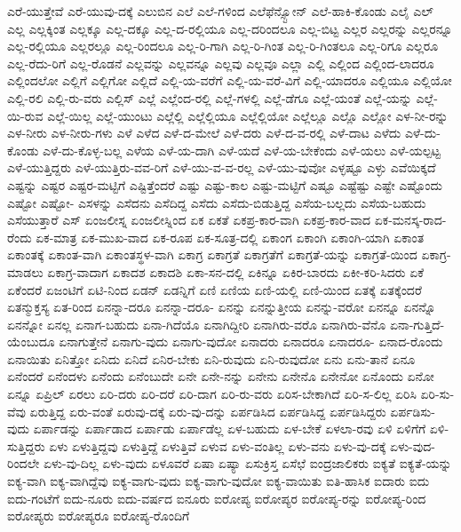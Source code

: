 {ಎರೆ-ಯುತ್ತೇವೆ
ಎರೆ-ಯುವು-ದಕ್ಕೆ
ಎಲುಬಿನ
ಎಲೆ
ಎಲೆ-ಗಳಿಂದ
ಎಲೆಫೆನ್ಸ್ಟೋನ್
ಎಲೆ-ಹಾಕಿ-ಕೊಂಡು
ಎಲೈ
ಎಲ್
ಎಲ್ಲ
ಎಲ್ಲಕ್ಕಿಂತ
ಎಲ್ಲಕ್ಕೂ
ಎಲ್ಲ-ದಕ್ಕೂ
ಎಲ್ಲ-ದ-ರಲ್ಲಿಯೂ
ಎಲ್ಲ-ದರಿಂದಲೂ
ಎಲ್ಲ-ಬಿಟ್ಟ
ಎಲ್ಲರ
ಎಲ್ಲರನ್ನು
ಎಲ್ಲರನ್ನೂ
ಎಲ್ಲ-ರಲ್ಲಿಯೂ
ಎಲ್ಲರಲ್ಲೂ
ಎಲ್ಲ-ರಿಂದಲೂ
ಎಲ್ಲ-ರಿ-ಗಾಗಿ
ಎಲ್ಲ-ರಿ-ಗಿಂತ
ಎಲ್ಲ-ರಿ-ಗಿಂತಲೂ
ಎಲ್ಲ-ರಿಗೂ
ಎಲ್ಲರೂ
ಎಲ್ಲ-ರೆದು-ರಿಗೆ
ಎಲ್ಲ-ರೊಡನೆ
ಎಲ್ಲವನ್ನು
ಎಲ್ಲವನ್ನೂ
ಎಲ್ಲವು
ಎಲ್ಲವೂ
ಎಲ್ಲಾ
ಎಲ್ಲಿ
ಎಲ್ಲಿಂದ
ಎಲ್ಲಿಂದ-ಲಾದರೂ
ಎಲ್ಲಿಂದಲೋ
ಎಲ್ಲಿಗೆ
ಎಲ್ಲಿಗೋ
ಎಲ್ಲಿದೆ
ಎಲ್ಲಿ-ಯ-ವರೆಗೆ
ಎಲ್ಲಿ-ಯ-ವರೆ-ವಿಗೆ
ಎಲ್ಲಿ-ಯಾದರೂ
ಎಲ್ಲಿಯೂ
ಎಲ್ಲಿಯೋ
ಎಲ್ಲಿ-ರಲಿ
ಎಲ್ಲಿ-ರು-ವರು
ಎಲ್ಲಿಸ್
ಎಲ್ಲೆ
ಎಲ್ಲೆಂದ-ರಲ್ಲಿ
ಎಲ್ಲೆ-ಗಳಲ್ಲಿ
ಎಲ್ಲೆ-ಡೆಗೂ
ಎಲ್ಲೆ-ಯಂತೆ
ಎಲ್ಲೆ-ಯನ್ನು
ಎಲ್ಲೆ-ಯಿ-ರುವ
ಎಲ್ಲೆ-ಯಿಲ್ಲ
ಎಲ್ಲೆ-ಯುಂಟು
ಎಲ್ಲೆಲ್ಲಿ
ಎಲ್ಲೆಲ್ಲಿಯೂ
ಎಲ್ಲೆಲ್ಲಿಯೋ
ಎಲ್ಲೆಲ್ಲೂ
ಎಲ್ಲೊ
ಎಲ್ಲೋ
ಎಳ-ನೀ-ರನ್ನು
ಎಳ-ನೀರು
ಎಳ-ನೀರು-ಗಳು
ಎಳೆ
ಎಳೆದ
ಎಳೆ-ದ-ಮೇಲೆ
ಎಳೆ-ದರು
ಎಳೆ-ದ-ವ-ರಲ್ಲಿ
ಎಳೆ-ದಾಟ
ಎಳೆದು
ಎಳೆ-ದು-ಕೊಂಡು
ಎಳೆ-ದು-ಕೊಳ್ಳ-ಬಲ್ಲ
ಎಳೆಯ
ಎಳೆ-ಯ-ದಾಗಿ
ಎಳೆ-ಯದೆ
ಎಳೆ-ಯ-ಬೇಕೆಂದು
ಎಳೆ-ಯಲು
ಎಳೆ-ಯಲ್ಪಟ್ಟ
ಎಳೆ-ಯುತ್ತಿದ್ದರು
ಎಳೆ-ಯುತ್ತಿರು-ವವ-ರಿಗೆ
ಎಳೆ-ಯು-ವ-ವ-ರಲ್ಲ
ಎಳೆ-ಯು-ವುವೋ
ಎಳ್ಳಷ್ಟೂ
ಎಳ್ಳು
ಎವೆಯಿಕ್ಕದೆ
ಎಷ್ಟನ್ನು
ಎಷ್ಟರ
ಎಷ್ಟರ-ಮಟ್ಟಿಗೆ
ಎಷ್ಟಿತ್ತೆಂದರೆ
ಎಷ್ಟು
ಎಷ್ಟು-ಕಾಲ
ಎಷ್ಟು-ಮಟ್ಟಿಗೆ
ಎಷ್ಟೂ
ಎಷ್ಟೆಷ್ಟು
ಎಷ್ಟೇ
ಎಷ್ಟೊಂದು
ಎಷ್ಟೋ
ಎಷ್ಟೋ-
ಎಸಳನ್ನು
ಎಸೆದನು
ಎಸೆದಿದ್ದ
ಎಸೆದು
ಎಸೆದು-ಬಿಡುತ್ತಿದ್ದ
ಎಸೆಯ-ಬಲ್ಲದು
ಎಸೆಯ-ಬಹುದು
ಎಸೆಯುತ್ತಾರೆ
ಎಸ್
ಏಂಜಲೀಸ್ನ
ಏಂಜಲೀಸ್ನಿಂದ
ಏಕ
ಏಕತೆ
ಏಕಪ್ರ-ಕಾರ-ವಾಗಿ
ಏಕಪ್ರ-ಕಾರ-ವಾದ
ಏಕ-ಮನಸ್ಕ-ರಾದ-ರೆಂದು
ಏಕ-ಮಾತ್ರ
ಏಕ-ಮುಖ-ವಾದ
ಏಕ-ರೂಪ
ಏಕ-ಸೂತ್ರ-ದಲ್ಲಿ
ಏಕಾಂಗ
ಏಕಾಂಗಿ
ಏಕಾಂಗಿ-ಯಾಗಿ
ಏಕಾಂತ
ಏಕಾಂತಕ್ಕೆ
ಏಕಾಂತ-ವಾಗಿ
ಏಕಾಂತಸ್ಥಳ-ವಾಗಿ
ಏಕಾಗ್ರ
ಏಕಾಗ್ರತೆ
ಏಕಾಗ್ರತೆಗೆ
ಏಕಾಗ್ರತೆ-ಯನ್ನು
ಏಕಾಗ್ರತೆ-ಯಿಂದ
ಏಕಾಗ್ರ-ಮಾಡಲು
ಏಕಾಗ್ರ-ವಾದಾಗ
ಏಕಾದಶ
ಏಕಾದಶಿ
ಏಕಾ-ಸನ-ದಲ್ಲಿ
ಏಕಿನ್ನೂ
ಏಕಿರ-ಬಾರದು
ಏಕೀ-ಕರಿ-ಸಿದರು
ಏಕೆ
ಏಕೆಂದರೆ
ಏಜಂಟಿಗೆ
ಏಟಿ-ನಿಂದ
ಏಡನ್
ಏಡನ್ನಿಗೆ
ಏಣಿ
ಏಣಿಯ
ಏಣಿ-ಯಲ್ಲಿ
ಏಣಿ-ಯಿಂದ
ಏತಕ್ಕೆ
ಏತಕ್ಕೆಂದರೆ
ಏತನ್ಮುಕ್ತಸ್ಯ
ಏತ-ರಿಂದ
ಏನನ್ನಾ-ದರೂ
ಏನನ್ನಾ-ದರೂ-
ಏನನ್ನು
ಏನನ್ನುತ್ತೀಯ
ಏನನ್ನು-ವರೋ
ಏನನ್ನೂ
ಏನನ್ನೊ
ಏನನ್ನೋ
ಏನಲ್ಲ
ಏನಾಗ-ಬಹುದು
ಏನಾ-ಗಿದೆಯೊ
ಏನಾಗಿದ್ದೀರಿ
ಏನಾಗಿರು-ವರೊ
ಏನಾಗಿರು-ವೆನೊ
ಏನಾ-ಗುತ್ತಿದೆ-ಯೆಂಬುದೂ
ಏನಾಗುತ್ತೇನೆ
ಏನಾಗು-ವುದು
ಏನಾಗು-ವುದೋ
ಏನಾದರು
ಏನಾದರೂ
ಏನಾದರೂ-
ಏನಾದ-ರೊಂದು
ಏನಾಯಿತು
ಏನಿತ್ತೋ
ಏನಿದು
ಏನಿದೆ
ಏನಿರ-ಬೇಕು
ಏನಿ-ರುವುದು
ಏನಿ-ರುವುದೋ
ಏನು
ಏನು-ತಾನೆ
ಏನೂ
ಏನೆಂದರೆ
ಏನೆಂದಳು
ಏನೆಂದು
ಏನೆಂಬುದೇ
ಏನೇ
ಏನೇ-ನನ್ನು
ಏನೇನು
ಏನೇನೊ
ಏನೇನೋ
ಏನೊಂದು
ಏನೋ
ಏನ್ನೂ
ಏಪ್ರಿಲ್
ಏರಲು
ಏರಿ-ದರು
ಏರಿ-ದರೆ
ಏರಿ-ದಾಗ
ಏರಿ-ರು-ವರು
ಏರಿಸ-ಬೇಕಾಗಿದೆ
ಏರಿ-ಸ-ಲಿಲ್ಲ
ಏರಿಸಿ
ಏರಿ-ಸು-ವೆವು
ಏರುತ್ತಿದ್ದ
ಏರು-ವಂತೆ
ಏರುವು-ದಕ್ಕೆ
ಏರು-ವು-ದನ್ನು
ಏರ್ಪಡಿಸಿದ
ಏರ್ಪಡಿಸಿದ್ದ
ಏರ್ಪಡಿಸಿದ್ದರು
ಏರ್ಪಡಿಸು-ವುದು
ಏರ್ಪಾಡನ್ನು
ಏರ್ಪಾಡಾದ
ಏರ್ಪಾಡು
ಏರ್ಪಾಡೆಲ್ಲ
ಏಳ-ಬಹುದು
ಏಳ-ಬೇಕೆ
ಏಳಲಾ-ರವು
ಏಳಿ
ಏಳಿಗೆಗೆ
ಏಳಿ-ಸುತ್ತಿದ್ದರು
ಏಳು
ಏಳುತ್ತಿದ್ದವು
ಏಳುತ್ತಿದ್ದೆ
ಏಳುತ್ತಿವೆ
ಏಳುವ
ಏಳು-ವಂತಿಲ್ಲ
ಏಳು-ವನು
ಏಳು-ವು-ದಕ್ಕೆ
ಏಳು-ವುದ-ರಿಂದಲೇ
ಏಳು-ವು-ದಿಲ್ಲ
ಏಳು-ವುದು
ಏಳೂವರೆ
ಏಷಾ
ಏಷ್ಯಾ
ಏಸುಕ್ರಿಸ್ತ
ಏಸೆಛೆ
ಐಂದ್ರಜಾಲಿಕರು
ಐಕ್ಯತೆ
ಐಕ್ಯತೆ-ಯನ್ನು
ಐಕ್ಯ-ವಾಗಿ
ಐಕ್ಯ-ವಾಗಿದ್ದೆವು
ಐಕ್ಯ-ವಾಗು-ವುದು
ಐಕ್ಯ-ವಾಗು-ವುದೋ
ಐಕ್ಯ-ವಾಯಿತು
ಐತಿ-ಹಾಸಿಕ
ಐದಾರು
ಐದು
ಐದು-ಗಂಟೆಗೆ
ಐದು-ನೂರು
ಐದು-ವರ್ಷದ
ಐನೂರು
ಐರೋಪ್ಯ
ಐರೋಪ್ಯರ
ಐರೋಪ್ಯ-ರನ್ನು
ಐರೋಪ್ಯ-ರಿಂದ
ಐರೋಪ್ಯರು
ಐರೋಪ್ಯರೂ
ಐರೋಪ್ಯ-ರೊಂದಿಗೆ
}
